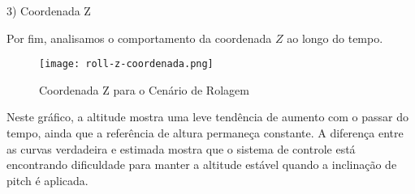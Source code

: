 3) Coordenada Z

Por fim, analisamos o comportamento da coordenada \(Z\) ao longo do tempo.

\begin{figure}[H]
	\centering
	\texttt{[image: roll-z-coordenada.png]}
	\caption{Coordenada Z para o Cenário de Rolagem}
	\label{fig:roll-z-coordenada}
\end{figure}

Neste gráfico, a altitude mostra uma leve tendência de aumento com o passar do tempo, ainda que a referência de altura permaneça constante. A diferença entre as curvas verdadeira e estimada mostra que o sistema de controle está encontrando dificuldade para manter a altitude estável quando a inclinação de pitch é aplicada.




\printindex
